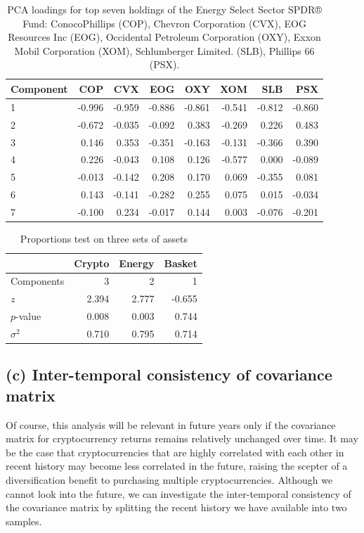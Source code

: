 \documentclass[12pt,twoside]{article}
\begin{document}
\begin{table}[h!]
	\centering
	\begin{tabular}{lrrrrrrr}
		\toprule
		Component &   COP &    CVX &    EOG &    OXY &    XOM &    SLB &    PSX \\
		\midrule
1         & -0.996 & -0.959 & -0.886 & -0.861 & -0.541 & -0.812 & -0.860 \\
2         & -0.672 & -0.035 & -0.092 &  0.383 & -0.269 &  0.226 &  0.483 \\
3         &  0.146 &  0.353 & -0.351 & -0.163 & -0.131 & -0.366 &  0.390 \\
4         &  0.226 & -0.043 &  0.108 &  0.126 & -0.577 &  0.000 & -0.089 \\
5         & -0.013 & -0.142 &  0.208 &  0.170 &  0.069 & -0.355 &  0.081 \\
6         &  0.143 & -0.141 & -0.282 &  0.255 &  0.075 &  0.015 & -0.034 \\
7         & -0.100 &  0.234 & -0.017 &  0.144 &  0.003 & -0.076 & -0.201 \\
		\bottomrule
	\end{tabular}
	\caption{PCA loadings for top seven holdings of the Energy Select Sector SPDR® Fund: ConocoPhillips (COP), Chevron Corporation (CVX), EOG Resources Inc (EOG), Occidental Petroleum Corporation (OXY), Exxon Mobil Corporation (XOM), Schlumberger Limited. (SLB), Phillips 66 (PSX).}
	\label{table:2}
\end{table}


\begin{table}[h!]
	\centering
\begin{tabular}{lrrr}
	\toprule
	{} &  Crypto &  Energy &  Basket \\
	\midrule
	Components &   3 &   2 &   1 \\
	$z$        &   2.394 &   2.777 &  -0.655 \\
	$p$-value  &   0.008 &   0.003 &   0.744 \\
	$\sigma^2$ &   0.710 &   0.795 &   0.714 \\
	\bottomrule
\end{tabular}
\caption{Proportions test on three sets of assets}
\label{table:3}
\end{table}

\subsection*{(c) Inter-temporal consistency of covariance matrix}

Of course, this analysis will be relevant in future years only if the covariance matrix for cryptocurrency returns remains relatively unchanged over time. It may be the case that cryptocurrencies that are highly correlated with each other in recent history may become less correlated in the future, raising the scepter of a diversification benefit to purchasing multiple cryptocurrencies. Although we cannot look into the future, we can investigate the inter-temporal consistency of the covariance matrix by splitting the recent history we have available into two samples.
\end{document}

